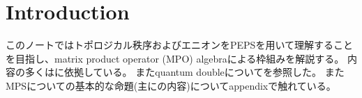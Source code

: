 \documentclass[\main/main.tex]{subfiles}
\begin{document}
\section{Introduction}

このノートではトポロジカル秩序およびエニオンをPEPSを用いて理解することを目指し、matrix product operator (MPO) algebraによる枠組みを解説する。
内容の多くは\cite{schuchPEPSGroundStates2010,sahinogluCharacterizingTopologicalOrder2021, bultinckAnyonsMatrixProduct2017}に依拠している。
またquantum doubleについて\cite{simonTopologicalQuantum2023}を参照した。
またMPSについての基本的な命題(主に\cite{perez-garciaMatrixProductState2007}の内容)についてappendixで触れている。
\end{document}
